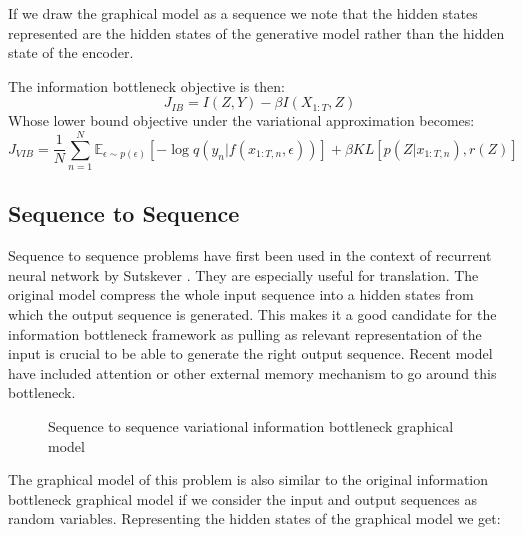 \documentclass[10pt,oneside,openright]{report}
\begin{document}
If we draw the graphical model as a sequence we note that the hidden states represented are the hidden states of the generative model rather than the hidden state of the encoder. 

The information bottleneck objective is then:
$$ J_{IB} = I(Z, Y) - \beta I(X_{1:T}, Z)$$
Whose lower bound objective under the variational approximation becomes:
 $$ J_{VIB} = \frac{1}{N}  \sum_{n=1}^{N} \mathbb{E}_{\epsilon \sim p(\epsilon)}[- \log q(y_{n} |f(x_{1:T, n}, \epsilon))] + \beta KL[p(Z|x_{1:T, n}), r(Z)]$$

\subsection{Sequence to Sequence}
Sequence to sequence problems have first been used in the context of recurrent neural network by Sutskever \cite{s2s}. They are especially useful for translation. The original model compress the whole input sequence into a hidden states from which the output sequence is generated. This makes it a good candidate for the information bottleneck framework as pulling as relevant representation of the input is crucial to be able to generate the right output sequence. Recent model have included attention \cite{attention} or other external memory mechanism to go around this bottleneck.

\begin{figure}[H]
\centering
{}
\caption{Sequence to sequence variational information bottleneck graphical model}
\end{figure}

The graphical model of this problem is also similar to the original information bottleneck graphical model if we consider the input and output sequences as random variables. Representing the hidden states of the graphical model we get: 
\end{document}
